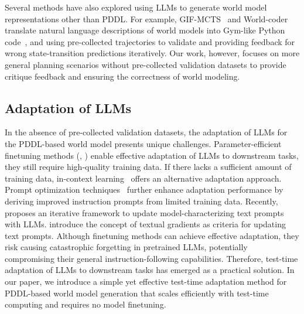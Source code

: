 Several methods have also explored using LLMs to generate world model representations other than PDDL.
For example, GIF-MCTS~\cite{dainese2024generating} and World-coder~\cite{tang2024worldcoder} translate natural language descriptions of world models into Gym-like Python code~\cite{1606.01540}, and using pre-collected trajectories to validate and providing feedback for wrong state-transition predictions iteratively. 
Our work, however, focuses on more general planning scenarios without pre-collected validation datasets to provide critique feedback and ensuring the correctness of world modeling.

\subsection{Adaptation of LLMs}
In the absence of pre-collected validation datasets, the adaptation of LLMs for the PDDL-based world model presents unique challenges.
Parameter-efficient finetuning methods (\eg, \cite{hu2022lora,qiu2023controlling,liu2024boft,ding2023parameter}) enable effective adaptation of LLMs to downstream tasks, they still require high-quality training data. 
If there lacks a sufficient amount of training data, in-context learning~\cite{brown2020language,wei2022emergent,dong2022survey} offers an alternative adaptation approach. 
Prompt optimization techniques~\cite{zhou2022large,pryzant2023automatic,yang2024large} further enhance adaptation performance by deriving improved instruction prompts from limited training data. 
Recently, \cite{xiao2024verbalized} proposes an iterative framework to update model-characterizing text prompts with LLMs. 
\cite{pryzant2023automatic,yuksekgonul2024textgrad} introduce the concept of textual gradients as criteria for updating text prompts. 
Although finetuning methods can achieve effective adaptation, they risk causing catastrophic forgetting in pretrained LLMs, potentially compromising their general instruction-following capabilities. 
Therefore, test-time adaptation of LLMs to downstream tasks has emerged as a practical solution.
In our paper, we introduce a simple yet effective test-time adaptation method for PDDL-based world model generation that scales efficiently with test-time computing and requires no model finetuning.
